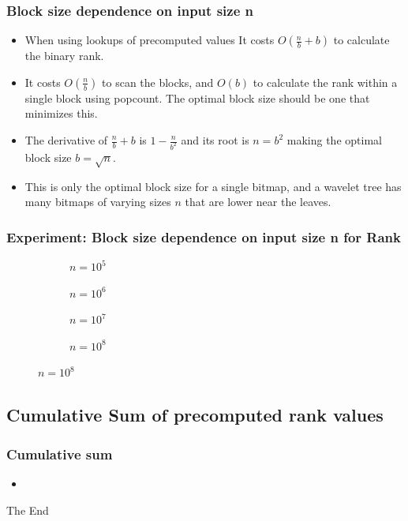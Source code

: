 \documentclass{beamer}
\begin{document}
\begin{frame}
\frametitle{Block size dependence on input size n}
\begin{itemize}
\item When using lookups of precomputed values
It costs $O(\frac{n}{b} + b)$ to calculate the binary rank.
\item It costs $O(\frac{n}{b})$ to scan the blocks, and $O(b)$ to calculate the rank within a single block using popcount. The optimal block size should be one that minimizes this.
\item The derivative of $\frac{n}{b}+b$ is $1-\frac{n}{b^2}$ and its root is $n = b^2$ making the optimal block size $b = \sqrt{n}$.
\item This is only the optimal block size for a single bitmap, and a wavelet tree has many bitmaps of varying sizes $n$ that are lower near the leaves.
\end{itemize}
\end{frame}

\begin{frame}
\frametitle{Experiment: Block size dependence on input size n for Rank}
\begin{figure}\tiny
\begin{subfigure}{0.48\textwidth}
	\scalebox{.5}{}
	\caption{$n = 10^5$}
\end{subfigure}
\hfill
\begin{subfigure}{0.48\textwidth}
	\scalebox{.5}{}
	\caption{$n = 10^6$}
\end{subfigure}

\begin{subfigure}{0.48\textwidth}
	\scalebox{.5}{}
	\caption{$n = 10^7$}
\end{subfigure}
\hfill	
\begin{subfigure}{0.48\textwidth}
	\scalebox{.5}{}
	\caption{$n = 10^8$}
\end{subfigure}
\end{figure}
\end{frame}

\subsection{Cumulative Sum of precomputed rank values}
\begin{frame}
\frametitle{Cumulative sum}
\begin{itemize}
\item
\end{itemize}
\end{frame}


\begin{frame}
\Huge{\centerline{The End}}
\end{frame}

\end{document}
